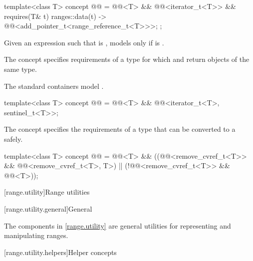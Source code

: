 \begin{itemdecl}
template<class T>
  concept @@ =
    @@<T> && @@<iterator_t<T>> &&
    requires(T& t) {
      { ranges::data(t) } -> @@<add_pointer_t<range_reference_t<T>>>;
    };
\end{itemdecl}

\pnum
Given an expression  such that  is ,
 models  only if
is .

\pnum
The  concept specifies requirements of
a  type for which  and
 return objects of the same type.
\begin{example}
The standard containers model .
\end{example}

\begin{itemdecl}
template<class T>
  concept @@ =
    @@<T> && @@<iterator_t<T>, sentinel_t<T>>;
\end{itemdecl}

\pnum
The  concept specifies the requirements of a
 type that can be converted to a  safely.

\begin{itemdecl}
template<class T>
  concept @@ =
    @@<T> &&
    ((@@<remove_cvref_t<T>> && @@<remove_cvref_t<T>, T>) ||
     (!@@<remove_cvref_t<T>> && @@<T>));
\end{itemdecl}

[range.utility]{Range utilities}

[range.utility.general]{General}

\pnum
The components in \ref{range.utility} are general utilities for representing and
manipulating ranges.

[range.utility.helpers]{Helper concepts}


